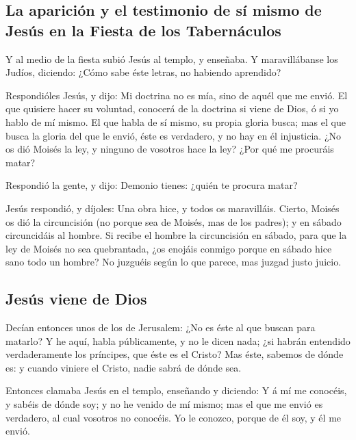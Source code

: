 \hypertarget{la-apariciuxf3n-y-el-testimonio-de-suxed-mismo-de-jesuxfas-en-la-fiesta-de-los-tabernuxe1culos}{%
\subsection{La aparición y el testimonio de sí mismo de Jesús en la
Fiesta de los
Tabernáculos}\label{la-apariciuxf3n-y-el-testimonio-de-suxed-mismo-de-jesuxfas-en-la-fiesta-de-los-tabernuxe1culos}}

 Y al medio de la fiesta subió Jesús al templo, y
enseñaba.  Y maravillábanse los Judíos, diciendo: ¿Cómo
sabe éste letras, no habiendo aprendido?

 Respondióles Jesús, y dijo: Mi doctrina no es mía, sino
de aquél que me envió.  El que quisiere hacer su
voluntad, conocerá de la doctrina si viene de Dios, ó si yo hablo de mí
mismo.  El que habla de sí mismo, su propia gloria busca;
mas el que busca la gloria del que le envió, éste es verdadero, y no hay
en él injusticia.  ¿No os dió Moisés la ley, y ninguno de
vosotros hace la ley? ¿Por qué me procuráis matar?

 Respondió la gente, y dijo: Demonio tienes: ¿quién te
procura matar?

 Jesús respondió, y díjoles: Una obra hice, y todos os
maravilláis.  Cierto, Moisés os dió la circuncisión (no
porque sea de Moisés, mas de los padres); y en sábado circuncidáis al
hombre.  Si recibe el hombre la circuncisión en sábado,
para que la ley de Moisés no sea quebrantada, ¿os enojáis conmigo porque
en sábado hice sano todo un hombre?  No juzguéis según lo
que parece, mas juzgad justo juicio.

\hypertarget{jesuxfas-viene-de-dios}{%
\subsection{Jesús viene de Dios}\label{jesuxfas-viene-de-dios}}

 Decían entonces unos de los de Jerusalem: ¿No es éste al
que buscan para matarlo?  Y he aquí, habla públicamente,
y no le dicen nada; ¿si habrán entendido verdaderamente los príncipes,
que éste es el Cristo?  Mas éste, sabemos de dónde es: y
cuando viniere el Cristo, nadie sabrá de dónde sea.

 Entonces clamaba Jesús en el templo, enseñando y
diciendo: Y á mí me conocéis, y sabéis de dónde soy; y no he venido de
mí mismo; mas el que me envió es verdadero, al cual vosotros no
conocéis.  Yo le conozco, porque de él soy, y él me
envió.


